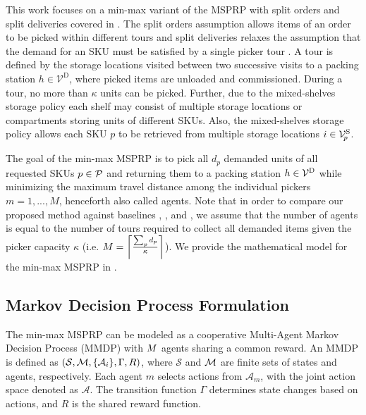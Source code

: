 
This work focuses on a min-max variant of the MSPRP with split orders and split deliveries covered in \cite{luttmann2024neural}. The split orders assumption allows items of an order to be picked
within different tours and split deliveries relaxes the assumption that the demand
for an SKU must be satisfied by a single picker tour \cite{xie2021introducing}. A tour is defined by the storage locations visited between two successive visits to a packing station $h \in \mathcal{V}^{\mathrm{D}}$, where picked items are unloaded and commissioned. During a tour, no more than $\kappa$ units can be picked. Further, due to the mixed-shelves storage policy each shelf may consist of multiple storage locations or compartments storing units of different SKUs. Also, the mixed-shelves storage policy allows each SKU $p$ to be retrieved from multiple storage locations $i \in \mathcal{V}_{\!p}^\text{S}$. 

The goal of the min-max MSPRP is to pick all $d_p$ demanded units of all requested SKUs $p \in \mathcal{P}$ and returning them to a packing station $h \in \mathcal{V}^{\text{D}}$ while minimizing the maximum travel distance among the individual pickers $m = 1,...,M$, henceforth also called agents. 
Note that in order to compare our proposed method against baselines \cite{luttmann2024neural}, \cite{liu20242d}, and \cite{son2024equity}, we assume that the number of agents is equal to the number of tours required to collect all demanded items given the picker capacity $\kappa$ (i.e. ${M} = \left \lceil \frac{\sum_p d_p}{\kappa} \right \rceil$). We provide the mathematical model for the min-max MSPRP in .



\subsection{Markov Decision Process Formulation}
\label{sec:mdp}
\newcommand{\setOfNodesMDP}{\mathcal{V}}
The min-max MSPRP can be modeled as a cooperative Multi-Agent Markov Decision Process (MMDP) with ${M}$ agents sharing a common reward. An MMDP is defined as $(\mathcal{S}, \mathcal{M}, \{\mathcal{A}_i\}, \Gamma, R)$, where $\mathcal{S}$ and $\mathcal{M}$ are finite sets of states and agents, respectively. Each agent $m$ selects actions from $\mathcal{A}_m$, with the joint action space denoted as $\bm{\mathcal{A}}$. The transition function $\Gamma$ determines state changes based on actions, and $R$ is the shared reward function.  

